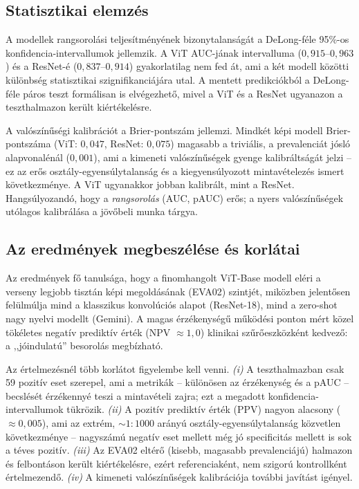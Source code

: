 \subsection{Statisztikai elemzés}

A modellek rangsorolási teljesítményének bizonytalanságát a DeLong-féle 95\%-os
konfidencia-intervallumok jellemzik. A ViT AUC-jának intervalluma
($0{,}915$--$0{,}963$) és a ResNet-é ($0{,}837$--$0{,}914$) gyakorlatilag nem
fed át, ami a két modell közötti különbség statisztikai szignifikanciájára utal.
A mentett predikciókból a DeLong-féle páros teszt formálisan is elvégezhető, mivel
a ViT és a ResNet ugyanazon a teszthalmazon került kiértékelésre.

A valószínűségi kalibrációt a Brier-pontszám jellemzi. Mindkét képi modell
Brier-pontszáma (ViT: $0{,}047$, ResNet: $0{,}075$) magasabb a triviális, a
prevalenciát jósló alapvonalénál ($0{,}001$), ami a kimeneti valószínűségek
gyenge kalibráltságát jelzi -- ez az erős osztály-egyensúlytalanság és a
kiegyensúlyozott mintavételezés ismert következménye. A ViT ugyanakkor jobban
kalibrált, mint a ResNet. Hangsúlyozandó, hogy a \textit{rangsorolás} (AUC, pAUC)
erős; a nyers valószínűségek utólagos kalibrálása a jövőbeli munka tárgya.

\subsection{Az eredmények megbeszélése és korlátai}

Az eredmények fő tanulsága, hogy a finomhangolt ViT-Base modell eléri a verseny
legjobb tisztán képi megoldásának (EVA02) szintjét, miközben jelentősen felülmúlja
mind a klasszikus konvolúciós alapot (ResNet-18), mind a zero-shot nagy nyelvi
modellt (Gemini). A magas érzékenységű működési ponton mért közel tökéletes
negatív prediktív érték (NPV $\approx 1{,}0$) klinikai szűrőeszközként kedvező: a
,,jó\-indulatú'' besorolás megbízható.

Az értelmezésnél több korlátot figyelembe kell venni. \emph{(i)} A teszthalmazban
csak 59 pozitív eset szerepel, ami a metrikák -- különösen az érzékenység és a
pAUC -- becslését érzékennyé teszi a mintavételi zajra; ezt a megadott
konfidencia-intervallumok tükrözik. \emph{(ii)} A pozitív prediktív érték (PPV)
nagyon alacsony ($\approx 0{,}005$), ami az extrém, $\sim 1{:}1000$ arányú
osztály-egyensúlytalanság közvetlen következménye -- nagyszámú negatív eset
mellett még jó specificitás mellett is sok a téves pozitív. \emph{(iii)} Az EVA02
eltérő (kisebb, magasabb prevalenciájú) halmazon és felbontáson került
kiértékelésre, ezért referenciaként, nem szigorú kontrollként értelmezendő.
\emph{(iv)} A kimeneti valószínűségek kalibrációja további javítást igényel.
